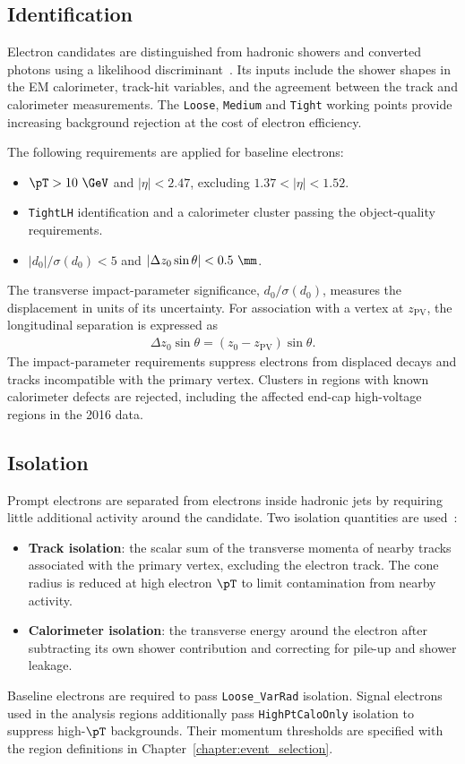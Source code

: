 \subsection{Identification}

Electron candidates are distinguished from hadronic showers and converted photons using a likelihood discriminant~\cite{ATLAS2019ElectronReco}.
Its inputs include the shower shapes in the EM calorimeter, track-hit variables, and the agreement between the track and calorimeter measurements.
The \texttt{Loose}, \texttt{Medium} and \texttt{Tight} working points provide increasing background rejection at the cost of electron efficiency.

The following requirements are applied for baseline electrons:
\begin{itemize}
    \item $\pT>10~\GeV$ and $|\eta|<2.47$, excluding $1.37<|\eta|<1.52$.
    \item \texttt{TightLH} identification and a calorimeter cluster passing the object-quality requirements.
    \item $|d_0|/\sigma(d_0)<5$ and $|\Delta z_0\sin\theta|<0.5~\mm$.
\end{itemize}
The transverse impact-parameter significance, $d_0/\sigma(d_0)$, measures the displacement in units of its uncertainty.
For association with a vertex at $z_{\mathrm{PV}}$, the longitudinal separation is expressed as
\begin{align}
    \Delta z_0\sin\theta=(z_0-z_{\mathrm{PV}})\sin\theta.
    \label{eq:ch6_track_longitudinal}
\end{align}
The impact-parameter requirements suppress electrons from displaced decays and tracks incompatible with the primary vertex.
Clusters in regions with known calorimeter defects are rejected, including the affected end-cap high-voltage regions in the 2016 data.

\subsection{Isolation}

Prompt electrons are separated from electrons inside hadronic jets by requiring little additional activity around the candidate.
Two isolation quantities are used~\cite{ATLAS2019ElectronPerformance}:
\begin{itemize}
    \item \textbf{Track isolation}: the scalar sum of the transverse momenta of nearby tracks associated with the primary vertex, excluding the electron track. The cone radius is reduced at high electron $\pT$ to limit contamination from nearby activity.
    \item \textbf{Calorimeter isolation}: the transverse energy around the electron after subtracting its own shower contribution and correcting for pile-up and shower leakage.
\end{itemize}
Baseline electrons are required to pass \texttt{Loose\_VarRad} isolation.
Signal electrons used in the analysis regions additionally pass \texttt{HighPtCaloOnly} isolation to suppress high-$\pT$ backgrounds.
Their momentum thresholds are specified with the region definitions in Chapter~\ref{chapter:event_selection}.

